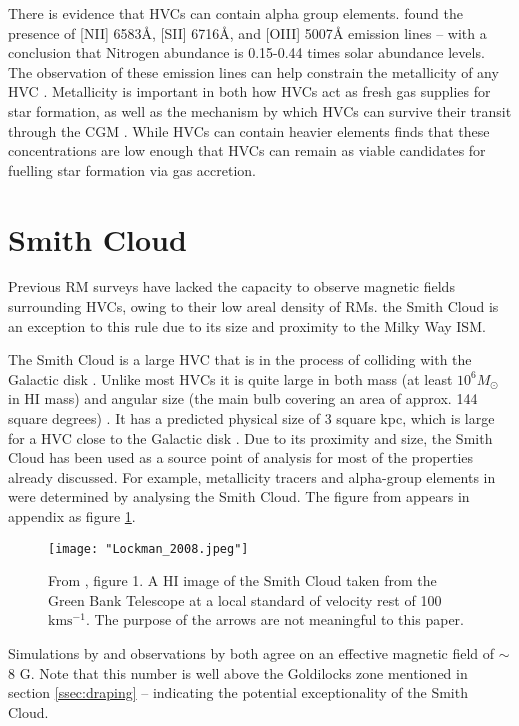 There is evidence that HVCs can contain alpha group elements. \cite{ID49, ID48} found the presence of [NII] 6583{\AA}, [SII] 6716{\AA}, and [OIII] 5007{\AA} emission lines – with a conclusion that Nitrogen abundance is 0.15-0.44 times solar abundance levels. The observation of these emission lines can help constrain the metallicity of any HVC  \citep{ID49}. Metallicity is important in both how HVCs act as fresh gas supplies for star formation, as well as the mechanism by which HVCs can survive their transit through the CGM \citep{ID24}. While HVCs can contain heavier elements \cite{ID46} finds that these concentrations are low enough that HVCs can remain as viable candidates for fuelling star formation via gas accretion.

\section{Smith Cloud}
\label{sec:sc}

Previous RM surveys have lacked the capacity to observe magnetic fields surrounding HVCs, owing to their low areal density of RMs. the Smith Cloud is an exception to this rule due to its size and proximity to the Milky Way ISM.


The Smith Cloud is a large HVC that is in the process of colliding with the Galactic disk \citep{ID28, ID64, ID35}. Unlike most HVCs it is quite large in both mass (at least $10^6 M_{\odot}$ in HI mass) and angular size (the main bulb covering an area of approx. 144 square degrees) \citep{ID28, ID64, ID35}. It has a predicted physical size of 3 square kpc, which is large for a HVC close to the Galactic disk \citep{ID28}. Due to its proximity and size, the Smith Cloud has been used as a source point of analysis for most of the properties already discussed. For example, metallicity tracers and alpha-group elements in \cite{ID48, ID49} were determined by analysing the Smith Cloud. The figure from \cite{ID28} appears in appendix as figure \ref{fig:sc}.

\begin{figure}
    \texttt{[image: "Lockman\_2008.jpeg"]}
    \centering
    \caption{From \cite{ID28}, figure 1. A HI image of the Smith Cloud taken from the Green Bank Telescope at a local standard of velocity rest of 100 $\mathrm{kms^{-1}}$. The purpose of the arrows are not meaningful to this paper.}
    \label{fig:sc}
\end{figure}


Simulations by \cite{ID23} and observations by \cite{ID26} both agree on an effective magnetic field of $\sim$8 {\textmu}G. Note that this number is well above the Goldilocks zone mentioned in section \ref{ssec:draping} – indicating the potential exceptionality of the Smith Cloud.


